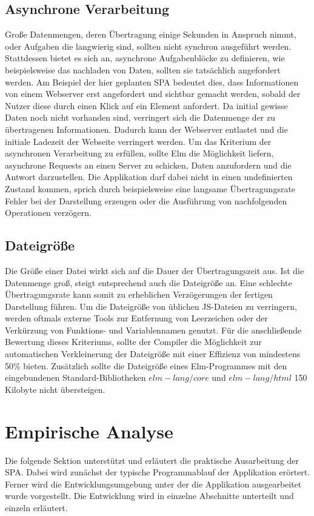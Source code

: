\subsection{Asynchrone Verarbeitung}
\label{sec:Asynchrone Verarbeitung}
Große Datenmengen, deren Übertragung einige Sekunden in Anspruch nimmt, oder Aufgaben die langwierig sind, sollten nicht synchron ausgeführt werden. Stattdessen bietet es sich an, asynchrone Aufgabenblöcke zu definieren, wie beispielsweise das nachladen von Daten, sollten sie tatsächlich angefordert werden. Am Beispiel der hier geplanten \ac{SPA} bedeutet dies, dass Informationen von einem Webserver erst angefordert und sichtbar gemacht werden, sobald der Nutzer diese durch einen Klick auf ein Element anfordert. Da initial gewisse Daten noch nicht vorhanden sind, verringert sich die Datenmenge der zu übertragenen Informationen. Dadurch kann der Webserver entlastet und die initiale Ladezeit der Webseite verringert werden. Um das Kriterium der asynchronen Verarbeitung zu erfüllen, sollte Elm die Möglichkeit liefern, asynchrone Requests an einen Server zu schicken, Daten anzufordern und die Antwort darzustellen. Die Applikation darf dabei nicht in einen undefinierten Zustand kommen, sprich durch beispielsweise eine langsame Übertragungsrate Fehler bei der Darstellung erzeugen oder die Ausführung von nachfolgenden Operationen verzögern.


\subsection{Dateigröße}
\label{sec:Dateigroesse}
Die Größe einer Datei wirkt sich auf die Dauer der Übertragungszeit aus. Ist die Datenmenge groß, steigt entsprechend auch die Dateigröße an. Eine schlechte Übertragungsrate kann somit zu erheblichen Verzögerungen der fertigen Darstellung führen. Um die Dateigröße von üblichen \ac{JS}-Dateien zu verringern, werden oftmals externe Tools zur Entfernung von Leerzeichen oder der Verkürzung von Funktions- und Variablennamen genutzt. Für die anschließende Bewertung dieses Kriteriums, sollte der Compiler die Möglichkeit zur automatischen Verkleinerung der Dateigröße mit einer Effizienz von mindestens 50\% bieten. Zusätzlich sollte die Dateigröße eines Elm-Programmes mit den eingebundenen Standard-Bibliotheken $elm-lang/core$ und $elm-lang/html$ 150 Kilobyte nicht übersteigen.

\newpage
\section{Empirische Analyse}
\label{sec:Empirische Analyse}
Die folgende Sektion unterstützt und erläutert die praktische Ausarbeitung der \ac{SPA}. Dabei wird zunächst der typische Programmablauf der Applikation erörtert. Ferner wird die Entwicklungsumgebung unter der die Applikation ausgearbeitet wurde vorgestellt. Die Entwicklung wird in einzelne Abschnitte unterteilt und einzeln erläutert.


